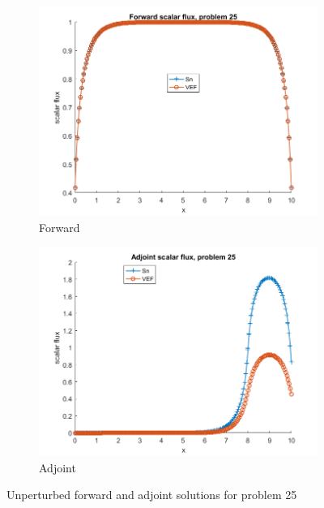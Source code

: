 \documentclass{article}
\begin{document}
\begin{figure}[H]
\centering
\begin{subfigure}{.5\textwidth}
  \centering
  \includegraphics[width=1\linewidth]{p25f.png}
  \caption{Forward}
  \label{fig:sub1}
\end{subfigure}%
\begin{subfigure}{.5\textwidth}
  \centering
  \includegraphics[width=1\linewidth]{p25a.png}
  \caption{Adjoint}
  \label{fig:sub2}
\end{subfigure}
\caption{Unperturbed forward and adjoint solutions for problem 25}
\label{fig:test}
\end{figure}
\end{document}
